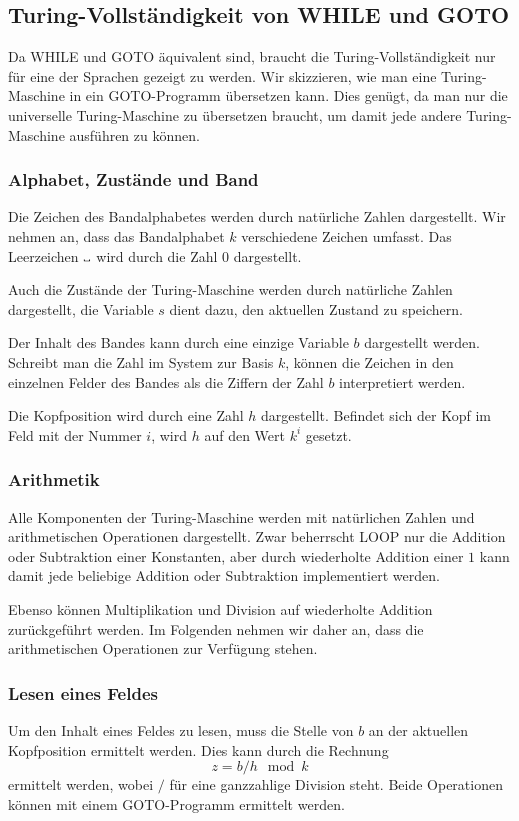 \subsection{Turing-Vollständigkeit von WHILE und GOTO}
Da WHILE und GOTO äquivalent sind, braucht die Turing-Vollständigkeit
nur für eine der Sprachen gezeigt zu werden.
Wir skizzieren, wie man eine Turing-Maschine in ein GOTO-Programm
übersetzen kann. Dies genügt, da man nur die universelle
Turing-Maschine zu übersetzen braucht, um damit jede andere
Turing-Maschine ausführen zu können.

\subsubsection{Alphabet, Zustände und Band}
Die Zeichen des Bandalphabetes werden durch natürliche Zahlen
dargestellt.  Wir nehmen an, dass das Bandalphabet $k$ verschiedene Zeichen
umfasst. Das Leerzeichen $\text{\textvisiblespace}$ wird durch die Zahl $0$
dargestellt.

Auch die Zustände der Turing-Maschine werden durch natürliche Zahlen
dargestellt,
die Variable $s$ dient dazu, den aktuellen Zustand zu
speichern.

Der Inhalt des Bandes kann durch eine einzige Variable $b$ dargestellt
werden. Schreibt man die Zahl im System zur Basis $k$, können die
Zeichen in den einzelnen Felder des Bandes als die Ziffern
der Zahl $b$ interpretiert werden.

Die Kopfposition wird durch eine Zahl $h$ dargestellt. Befindet sich
der Kopf im Feld mit der Nummer $i$, wird $h$ auf den Wert $k^i$
gesetzt.

\subsubsection{Arithmetik}
Alle Komponenten der Turing-Maschine werden mit natürlichen Zahlen
und arithmetischen Operationen dargestellt.
Zwar beherrscht LOOP nur die Addition oder Subtraktion einer Konstanten,
aber durch wiederholte Addition einer $1$ kann damit jede beliebige
Addition oder Subtraktion implementiert werden.

Ebenso können Multiplikation und Division auf wiederholte Addition
zurückgeführt werden.
Im Folgenden nehmen wir daher an, dass die arithmetischen Operationen
zur Verfügung stehen.

\subsubsection{Lesen eines Feldes}
Um den Inhalt eines Feldes zu lesen, muss die Stelle von $b$ an der
aktuellen Kopfposition ermittelt werden.
Dies kann durch die Rechnung
\begin{equation}
z=b / h \mod k
\label{getchar}
\end{equation}
ermittelt werden, wobei $/$ für eine ganzzahlige Division steht.
Beide Operationen können mit einem GOTO-Programm ermittelt werden.

